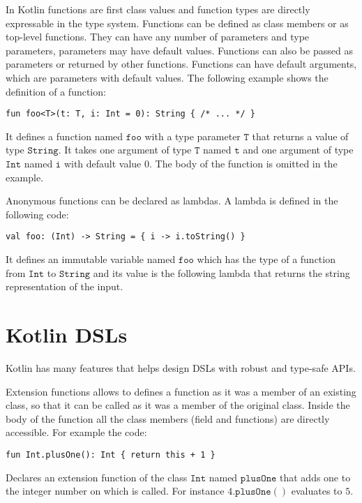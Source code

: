 In Kotlin functions are first class values and function types are directly expressable in the type system. Functions can be defined as class members or as top-level functions. They can have any number of parameters and type parameters, parameters may have default values. Functions can also be passed as parameters or returned by other functions. Functions can have default arguments, which are parameters with default values. The following example shows the definition of a function:
\begin{lstlisting}[language={kotac}]
fun foo<T>(t: T, i: Int = 0): String { /* ... */ }
\end{lstlisting}
It defines a function named $\mathtt{foo}$ with a type parameter $\mathtt{T}$ that returns a value of type $\mathtt{String}$. It takes one argument of type $\mathtt{T}$ named $\mathtt{t}$ and one argument of type $\mathtt{Int}$ named $\mathtt{i}$ with default value $0$. The body of the function is omitted in the example.

Anonymous functions can be declared as lambdas. A lambda is defined in the following code:
\begin{lstlisting}[language={kotac}]
val foo: (Int) -> String = { i -> i.toString() }
\end{lstlisting}
It defines an immutable variable named $\mathtt{foo}$ which has the type of a function from $\mathtt{Int}$ to $\mathtt{String}$ and its value is the following lambda that returns the string representation of the input.

\section{Kotlin DSLs}

Kotlin has many features that helps design DSLs with robust and type-safe APIs.

Extension functions allows to defines a function as it was a member of an existing class, so that it can be called as it was a member of the original class. Inside the body of the function all the class members (field and functions) are directly accessible.
For example the code:
\begin{lstlisting}[language={kotac}]
fun Int.plusOne(): Int { return this + 1 }
\end{lstlisting}
Declares an extension function of the class $\mathtt{Int}$ named $\mathtt{plusOne}$ that adds one to the integer number on which is called. For instance $4\mathtt{.plusOne()}$ evaluates to $5$.

